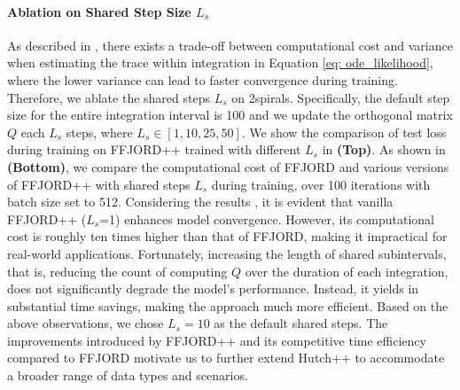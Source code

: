 \paragraph{Ablation on Shared Step Size $L_s$}
As described in , there exists a trade-off between computational cost and variance when estimating the trace within integration in Equation \ref{eq: ode_likelihood}, where the lower variance can lead to faster convergence during training.
Therefore, we ablate the shared steps $L_s$ on 2spirals. Specifically, the default step size for the entire integration interval is 100 and we update the orthogonal matrix $Q$ each $L_s$ steps, where $L_s \in [1, 10, 25, 50]$. We show the comparison of test loss during training on FFJORD++ trained with different $L_s$ in  \textbf{(Top)}.
As shown in~ \textbf{(Bottom)}, we compare the computational cost of FFJORD and various versions of FFJORD++ with shared steps $L_s$ during training, over 100 iterations with batch size set to 512. 
Considering the results , it is evident that vanilla FFJORD++ ($L_s$=1) enhances model convergence.
However, its computational cost is roughly ten times higher than that of FFJORD, making it impractical for real-world applications.
Fortunately, increasing the length of shared subintervals, that is, reducing the count of computing $Q$ over the duration of each integration, does not significantly degrade the model's performance. 
Instead, it yields in substantial time savings, making the approach much more efficient.
Based on the above observations, we chose $L_s = 10$ as the default shared steps. 
The improvements introduced by FFJORD++ and its competitive time efficiency compared to FFJORD motivate us to further extend Hutch++ to accommodate a broader range of data types and scenarios.


